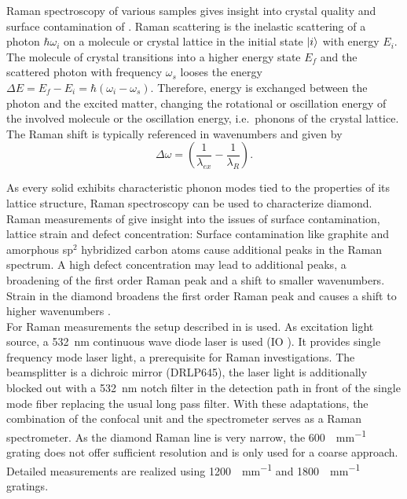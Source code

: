 			Raman spectroscopy of various samples gives insight into crystal quality and surface contamination of \nds.
			Raman scattering is the inelastic scattering of a photon $\hbar\omega_i$ on a molecule or crystal lattice in the initial state $\ket{i}$ with energy $E_i$.
			The molecule of crystal transitions into a higher energy state $E_f$ and the scattered photon with frequency $\omega_s$ looses the energy $\Delta E = E_f - E_i = \hbar(\omega_i-\omega_s)$.
			Therefore, energy is exchanged between the photon and the excited matter, changing the rotational or oscillation energy of the involved molecule or the oscillation energy, i.e.\ phonons of the crystal lattice.
			The Raman shift is typically referenced in wavenumbers and given by
% 
			\begin{equation}
				\Delta \omega = \left( \frac{1}{\lambda_{ex}}-\frac{1}{\lambda_R}\right).
			\end{equation}

			As every solid exhibits characteristic phonon modes tied to the properties of its lattice structure, Raman spectroscopy can be used to characterize diamond.
			Raman measurements of \nds give insight into the issues of surface contamination, lattice strain and defect concentration:
			Surface contamination like graphite and amorphous sp$^2$ hybridized carbon atoms cause additional peaks in the Raman spectrum.
			A high defect concentration may lead to additional peaks, a broadening of the first order Raman peak and a shift to smaller wavenumbers.
			Strain in the diamond broadens the first order Raman peak and causes a shift to higher wavenumbers \cite{Zaitsev2001,Prawer2004,Orwa2000}.
			\\
			For Raman measurements the setup described in  is used.
			As excitation light source, a \SI{532}{nm} continuous wave diode laser is used (IO ).
			It provides single frequency mode laser light, a prerequisite for Raman investigations.
			The beamsplitter is a dichroic mirror (DRLP645), the laser light is additionally blocked out with a \SI{532}{\nm} notch filter in the detection path in front of the single mode fiber replacing the usual long pass filter.
			With these adaptations, the combination of the confocal unit and the spectrometer serves as a Raman spectrometer.
			As the diamond Raman line is very narrow, the \SI[per-mode=symbol]{600}{\lines\per\mm} grating does not offer sufficient resolution and is only used for a coarse approach. Detailed measurements are realized using \SI[per-mode=symbol]{1200}{\lines\per\mm} and \SI[per-mode=symbol]{1800}{\lines\per\mm} gratings.
			\\

